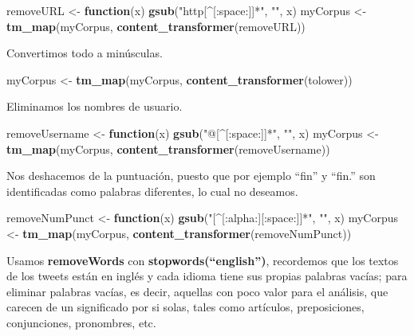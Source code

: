 \documentclass[
]{article}
\newenvironment{Shaded}{\begin{snugshade}}{\end{snugshade}}
\newcommand{\ControlFlowTok}[1]{\textcolor[rgb]{0.13,0.29,0.53}{\textbf{#1}}}
\newcommand{\KeywordTok}[1]{\textcolor[rgb]{0.13,0.29,0.53}{\textbf{#1}}}
\newcommand{\NormalTok}[1]{#1}
\newcommand{\StringTok}[1]{\textcolor[rgb]{0.31,0.60,0.02}{#1}}
\begin{document}
\begin{Shaded}
\begin{Highlighting}[]
\NormalTok{removeURL <-}\StringTok{ }\ControlFlowTok{function}\NormalTok{(x) }\KeywordTok{gsub}\NormalTok{(}\StringTok{"http[^[:space:]]*"}\NormalTok{, }\StringTok{""}\NormalTok{, x)  }
\NormalTok{myCorpus <-}\StringTok{ }\KeywordTok{tm_map}\NormalTok{(myCorpus, }\KeywordTok{content_transformer}\NormalTok{(removeURL))}
\end{Highlighting}
\end{Shaded}

Convertimos todo a minúsculas.

\begin{Shaded}
\begin{Highlighting}[]
\NormalTok{myCorpus <-}\StringTok{ }\KeywordTok{tm_map}\NormalTok{(myCorpus, }\KeywordTok{content_transformer}\NormalTok{(tolower))}
\end{Highlighting}
\end{Shaded}

Eliminamos los nombres de usuario.

\begin{Shaded}
\begin{Highlighting}[]
\NormalTok{removeUsername <-}\StringTok{ }\ControlFlowTok{function}\NormalTok{(x) }\KeywordTok{gsub}\NormalTok{(}\StringTok{"@[^[:space:]]*"}\NormalTok{, }\StringTok{""}\NormalTok{, x)  }
\NormalTok{myCorpus <-}\StringTok{ }\KeywordTok{tm_map}\NormalTok{(myCorpus, }\KeywordTok{content_transformer}\NormalTok{(removeUsername))}
\end{Highlighting}
\end{Shaded}

Nos deshacemos de la puntuación, puesto que por ejemplo ``fin'' y
``fin.'' son identificadas como palabras diferentes, lo cual no
deseamos.

\begin{Shaded}
\begin{Highlighting}[]
\NormalTok{removeNumPunct <-}\StringTok{ }\ControlFlowTok{function}\NormalTok{(x) }\KeywordTok{gsub}\NormalTok{(}\StringTok{"[^[:alpha:][:space:]]*"}\NormalTok{, }\StringTok{""}\NormalTok{, x)   }
\NormalTok{myCorpus <-}\StringTok{ }\KeywordTok{tm_map}\NormalTok{(myCorpus, }\KeywordTok{content_transformer}\NormalTok{(removeNumPunct))}
\end{Highlighting}
\end{Shaded}

Usamos \textbf{removeWords} con \textbf{stopwords(``english'')},
recordemos que los textos de los tweets están en inglés y cada idioma
tiene sus propias palabras vacías; para eliminar palabras vacías, es
decir, aquellas con poco valor para el análisis, que carecen de un
significado por si solas, tales como artículos, preposiciones,
conjunciones, pronombres, etc.
\end{document}
